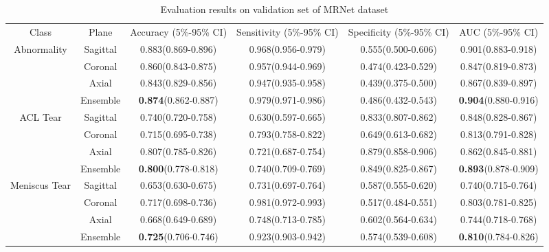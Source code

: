 \documentclass[journal]{IEEEtai}
\begin{document}
\begin{table*}[!h]
    \centering
    \bgroup
    \caption{Evaluation results on validation set of MRNet dataset}
    \def\arraystretch{1.5}
    \begin{tabular}{c|c|c|c|c|c}
    \hline
        \multirow{2}{*}{Class} & \multirow{2}{*}{Plane} & \multirow{2}{2.5cm}{\centering Accuracy (5\%-95\% CI)}& \multirow{2}{2.5cm}{\centering Sensitivity (5\%-95\% CI)} & \multirow{2}{2.5cm}{\centering Specificity (5\%-95\% CI)} & \multirow{2}{2.5cm}{\centering AUC (5\%-95\% CI)}\\
        {}& {} & {} & {} & {} & {}\\ 
        \hline \hline
        \multirow{4}{*}{Abnormality}&Sagittal&
        0.883(0.869-0.896) & 0.968(0.956-0.979) &
        0.555(0.500-0.606) & 0.901(0.883-0.918)\\ \cline{2-6}
        {}&Coronal&0.860(0.843-0.875)&0.957(0.944-0.969)&
        0.474(0.423-0.529)&0.847(0.819-0.873)\\ \cline{2-6}
        {}&Axial&0.843(0.829-0.856)&0.947(0.935-0.958)&
        0.439(0.375-0.500)&0.867(0.839-0.897)\\ \cline{2-6}
        {}&Ensemble&\textbf{0.874}(0.862-0.887)&0.979(0.971-0.986)&
        0.486(0.432-0.543)& \textbf{0.904}(0.880-0.916)\\ \hline
        \multirow{4}{*}{ACL Tear}&Sagittal&
        0.740(0.720-0.758) & 0.630(0.597-0.665) & 0.833(0.807-0.862) & 0.848(0.828-0.867)\\ \cline{2-6}
        {}&Coronal&0.715(0.695-0.738)&0.793(0.758-0.822)&
        0.649(0.613-0.682)&0.813(0.791-0.828)\\ \cline{2-6}
        {}&Axial&0.807(0.785-0.826)&0.721(0.687-0.754)&
        0.879(0.858-0.906)&0.862(0.845-0.881)\\ \cline{2-6}
        {}&Ensemble&\textbf{0.800}(0.778-0.818)&0.740(0.709-0.769)&
        0.849(0.825-0.867)&\textbf{0.893}(0.878-0.909)\\ \hline
        \multirow{4}{*}{Meniscus Tear}&Sagittal&
        0.653(0.630-0.675) & 0.731(0.697-0.764) & 0.587(0.555-0.620) & 0.740(0.715-0.764)\\ \cline{2-6}
        {}&Coronal&0.717(0.698-0.736)&0.981(0.972-0.993)&
        0.517(0.484-0.551)&0.803(0.781-0.825)\\ \cline{2-6}
        {}&Axial&0.668(0.649-0.689)&0.748(0.713-0.785)&
        0.602(0.564-0.634)&0.744(0.718-0.768)\\ \cline{2-6}
        {}&Ensemble&\textbf{0.725}(0.706-0.746)&0.923(0.903-0.942)&
        0.574(0.539-0.608)&\textbf{0.810}(0.784-0.826)\\ \hline
         
    \end{tabular}
    \label{tab:evaluation}
    \egroup
    
\end{table*}
\end{document}
